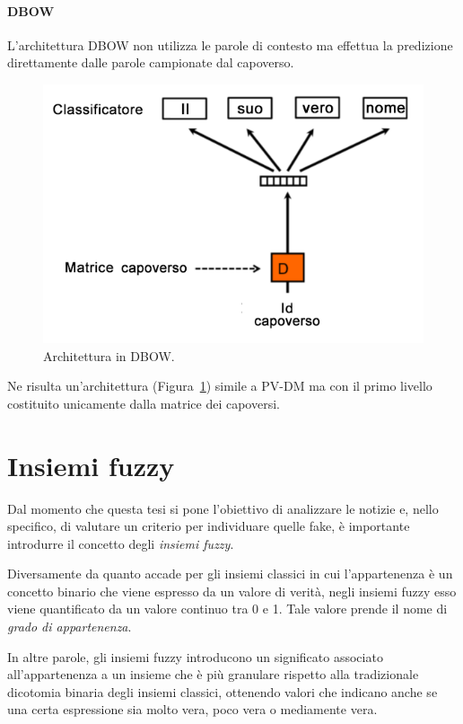 \documentclass[12pt]{report}
\theoremstyle{definition}
\begin{document}
\paragraph{DBOW}
L'architettura DBOW non utilizza le parole di contesto ma effettua la predizione direttamente dalle parole campionate dal capoverso.
\begin{figure}
    \centering
    \includegraphics[scale = 0.45]{images/dbow.png}
    \caption{Architettura in DBOW.}
    \label{dbow}
\end{figure}
Ne risulta un'architettura (Figura~\ref{dbow}) simile a PV-DM ma con il primo livello costituito unicamente dalla matrice dei capoversi.

\section{Insiemi fuzzy} \label{insiemifuzzy}
Dal momento che questa tesi si pone l'obiettivo di analizzare le notizie e, nello specifico, di valutare un criterio per individuare quelle fake, è importante introdurre il concetto degli \textit{insiemi fuzzy}.

Diversamente da quanto accade per gli insiemi classici in cui l'appartenenza  è un concetto binario che viene espresso da un valore di verità, negli insiemi fuzzy esso viene quantificato da un valore continuo tra 0 e 1.
Tale valore prende il nome di \textit{grado di appartenenza}.

In altre parole, gli insiemi fuzzy introducono un significato associato all'appartenenza a un insieme che è più granulare rispetto alla tradizionale dicotomia binaria degli insiemi classici, ottenendo valori che indicano anche se una certa espressione sia molto vera, poco vera o mediamente vera.
\end{document}
